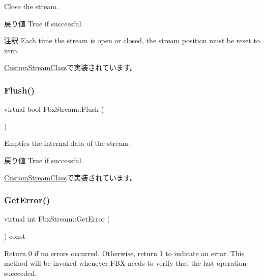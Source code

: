 Close the stream. \begin{DoxyReturn}{戻り値}
True if successful. 
\end{DoxyReturn}
\begin{DoxyRemark}{注釈}
Each time the stream is open or closed, the stream position must be reset to zero. 
\end{DoxyRemark}


\hyperlink{class_custom_stream_class_a8871348021c69d6912a12298626195f6}{Custom\+Stream\+Class}で実装されています。

\mbox{\label{class_fbx_stream_a9174d1c9a10e7f0f6f283c6b7f9a1dce}} 
\subsubsection{\texorpdfstring{Flush()}{Flush()}}
{\footnotesize\ttfamily virtual bool Fbx\+Stream\+::\+Flush (\begin{DoxyParamCaption}{ }\end{DoxyParamCaption})\hspace{0.3cm}{\ttfamily [pure virtual]}}

Empties the internal data of the stream. \begin{DoxyReturn}{戻り値}
True if successful. 
\end{DoxyReturn}


\hyperlink{class_custom_stream_class_a4b5d2980af50604d2cb5ec900ef8488a}{Custom\+Stream\+Class}で実装されています。

\mbox{\label{class_fbx_stream_adec0d602a55d05e923980e048b8d5b54}} 
\subsubsection{\texorpdfstring{Get\+Error()}{GetError()}}
{\footnotesize\ttfamily virtual int Fbx\+Stream\+::\+Get\+Error (\begin{DoxyParamCaption}{ }\end{DoxyParamCaption}) const\hspace{0.3cm}{\ttfamily [pure virtual]}}

Return 0 if no errors occurred. Otherwise, return 1 to indicate an error. This method will be invoked whenever F\+BX needs to verify that the last operation succeeded. 

